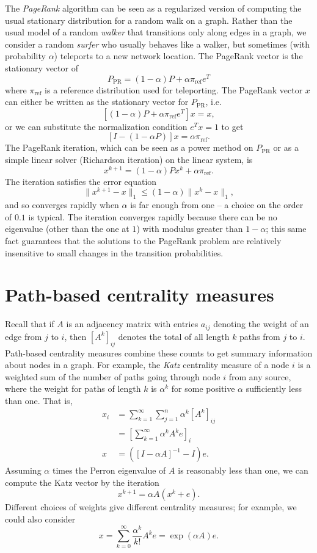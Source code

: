\documentclass[12pt, leqno]{article} %
\begin{document}
The {\em PageRank} algorithm can be seen as a regularized version of
computing the usual stationary distribution for a random walk on a
graph.  Rather than the usual model of a random {\em walker} that
transitions only along edges in a graph, we consider a random
{\em surfer} who usually behaves like a walker, but sometimes (with
probability $\alpha$) teleports to a new network location.
The PageRank vector is the stationary vector of
\[
  P_{\mathrm{PR}} = (1-\alpha) P + \alpha \pi_{\mathrm{ref}} e^T
\]
where $\pi_{\mathrm{ref}}$ is a reference distribution used for
teleporting.  The PageRank vector $x$ can either be written as the
stationary vector for $P_{\mathrm{PR}}$, i.e.
\[
  \left[ (1-\alpha) P + \alpha \pi_{\mathrm{ref}} e^T \right] x = x,
\]
or we can substitute the normalization condition $e^T x = 1$ to get
\[
  \left[ I - (1-\alpha P) \right] x = \alpha \pi_{\mathrm{ref}}.
\]
The PageRank iteration, which can be seen as a power method on
$P_{\mathrm{PR}}$ or as a simple linear solver (Richardson iteration)
on the linear system, is
\[
  x^{k+1} = (1-\alpha) P x^{k} + \alpha \pi_{\mathrm{ref}}.
\]
The iteration satisfies the error equation
\[
  \|x^{k+1}-x\|_1 \leq (1-\alpha) \|x^{k}-x\|_1,
\]
and so converges rapidly when $\alpha$ is far enough from one -- a
choice on the order of $0.1$ is typical.  The iteration converges
rapidly because there can be no eigenvalue (other than the one at $1$)
with modulus greater than $1-\alpha$; this same fact guarantees that
the solutions to the PageRank problem are relatively insensitive to
small changes in the transition probabilities.

\section{Path-based centrality measures}

Recall that if $A$ is an adjacency matrix with entries
$a_{ij}$ denoting the weight of an edge from $j$ to $i$, then
$[A^k]_{ij}$ denotes the total of all length $k$ paths from $j$
to $i$.  Path-based centrality measures combine these counts to get
summary information about nodes in a graph.  For example,
the {\em Katz} centrality measure of a node $i$ is a weighted sum of
the number of paths going through node $i$ from any source,
where the weight for paths of length $k$ is $\alpha^k$ for some
positive $\alpha$ sufficiently less than one.  That is,
\begin{align*}
  x_i
  &= \sum_{k=1}^\infty \sum_{j=1}^n \alpha^k [A^k]_{ij} \\
  &= \left[ \sum_{k=1}^\infty \alpha^k A^k e \right]_i \\
  x &= \left( [I-\alpha A]^{-1} - I \right) e.
\end{align*}
Assuming $\alpha$ times the Perron eigenvalue of $A$ is reasonably
less than one, we can compute the Katz vector by the iteration
\[
  x^{k+1} = \alpha A (x^k + e).
\]
Different choices of weights give different centrality measures;
for example, we could also consider
\[
  x = \sum_{k=0}^\infty \frac{\alpha^k}{k!} A^k e = \exp(\alpha A) e.
\]
\end{document}
